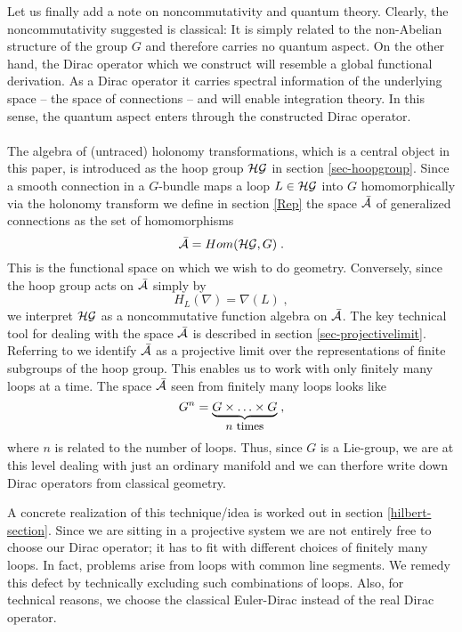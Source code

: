 \documentclass[12pt]{article}
\def\ca{{\cal A}}
\def\cg{{\cal G}}
\def\ch{{\cal H}}
\begin{document}
Let us finally add a note on noncommutativity and quantum theory. Clearly, the
noncommutativity suggested is classical: It is simply related to the
non-Abelian structure of the group $G$ and therefore carries no quantum
aspect. On the other hand, the Dirac operator which we construct will resemble
a global functional derivation. As a Dirac operator it carries spectral
information of the underlying space -- the space of connections -- and will
enable integration theory. In this sense, the quantum aspect enters through
the constructed Dirac operator.\\


\\

The algebra of (untraced) holonomy transformations, which is a central object in
this paper, is introduced as the hoop group $\ch\cg$ in section
\ref{sec-hoopgroup}. Since a smooth connection in a $G$-bundle maps a loop $L\in\ch\cg$
into $G$ homomorphically via the holonomy transform we define in section \ref{Rep} the space $\bar{\ca}$ of
generalized connections as the set of homomorphisms
\[
\bar{\ca}= Hom(\ch\cg,G)\;.
\] 
This is the functional space on which we wish to do geometry.
Conversely, since the hoop group acts on $\bar{\ca}$ simply by 
\[
H_L(\nabla)= \nabla(L)\;,
\]
we interpret $\ch\cg$ as a noncommutative function algebra on $\bar{\ca}$. The
key technical tool for dealing with the space $\bar{\ca}$ is described in
section \ref{sec-projectivelimit}. Referring to \cite{Marolf:1994cj} we identify $\bar{\ca}$ as a projective limit
over the representations of finite subgroups of the hoop group. This enables
us to work with only finitely many loops at a time. The space $\bar{\ca}$ seen
from finitely many loops looks like
\[
G^n= \underbrace{G\times\ldots\times G}_{\mbox{\small $n$ times}}\;,
\] 
where $n$ is related to the number
of loops. Thus, since $G$ is a Lie-group, we are at this level dealing with just an ordinary manifold and
we can therfore write down Dirac operators from classical geometry. 

A concrete realization of this technique/idea is worked out in  section
\ref{hilbert-section}. Since we are sitting in a projective system we are not entirely free
to choose our Dirac operator; it has to fit with different choices of finitely
many loops. In fact, problems arise from loops with common line segments. We
remedy this defect by technically excluding such combinations of loops. Also,
for technical reasons, we choose the classical Euler-Dirac instead of the real
Dirac operator.
\end{document}
